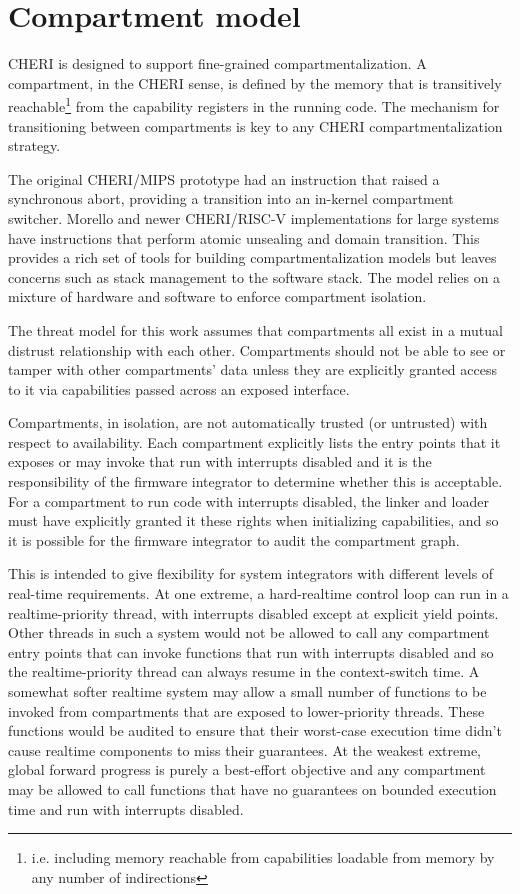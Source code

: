 \chapter{Compartment model}
\label{chap:compartmentmodel}
CHERI is designed to support fine-grained compartmentalization.
A compartment, in the CHERI sense, is defined by the memory that is transitively reachable\footnote{i.e. including memory reachable from capabilities loadable from memory by any number of indirections} from the capability registers in the running code.
The mechanism for transitioning between compartments is key to any CHERI compartmentalization strategy.

The original CHERI/MIPS prototype had an instruction that raised a synchronous abort, providing a transition into an in-kernel compartment switcher.
Morello and newer CHERI/RISC-V implementations for large systems have instructions that perform atomic unsealing and domain transition.
This provides a rich set of tools for building compartmentalization models but leaves concerns such as stack management to the software stack.
The \cherimcu{} model relies on a mixture of hardware and software to enforce compartment isolation.

The threat model for this work assumes that compartments all exist in a mutual distrust relationship with each other.
Compartments should not be able to see or tamper with other compartments' data unless they are explicitly granted access to it via capabilities passed across an exposed interface.

Compartments, in isolation, are not automatically trusted (or untrusted) with respect to availability.
Each compartment explicitly lists the entry points that it exposes or may invoke that run with interrupts disabled and it is the responsibility of the firmware integrator to determine whether this is acceptable.
For a compartment to run code with interrupts disabled, the linker and loader must have explicitly granted it these rights when initializing capabilities, and so it is possible for the firmware integrator to audit the compartment graph.

This is intended to give flexibility for system integrators with different levels of real-time requirements.
At one extreme, a hard-realtime control loop can run in a realtime-priority thread, with interrupts disabled except at explicit yield points.
Other threads in such a system would not be allowed to call any compartment entry points that can invoke functions that run with interrupts disabled and so the realtime-priority thread can always resume in the context-switch time.
A somewhat softer realtime system may allow a small number of functions to be invoked from compartments that are exposed to lower-priority threads.
These functions would be audited to ensure that their worst-case execution time didn't cause realtime components to miss their guarantees.
At the weakest extreme, global forward progress is purely a best-effort objective and any compartment may be allowed to call functions that have no guarantees on bounded execution time and run with interrupts disabled.

